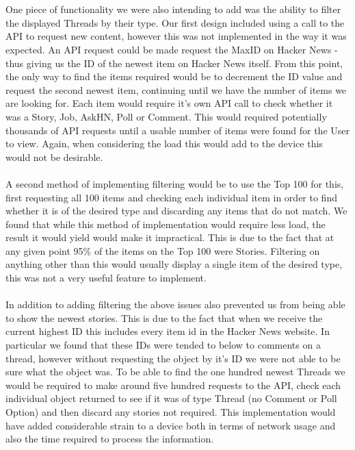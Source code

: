 \documentclass[11pt]{article}
\begin{document}
\\
\\
One piece of functionality we were also intending to add was the ability to filter the displayed Threads by their type. Our first design included using a call to the API to request new content, however this was not implemented in the way it was expected. An API request could be made request the MaxID on Hacker News - thus giving us the ID of the newest item on Hacker News itself. From this point, the only way to find the items required would be to decrement the ID value and request the second newest item, continuing until we have the number of items we are looking for. Each item would require it’s own API call to check whether it was a Story, Job, AskHN, Poll or Comment. This would required potentially thousands of API requests until a usable number of items were found for the User to view. Again, when considering the load this would add to the device this would not be desirable.
\\
\\
A second method of implementing filtering would be to use the Top 100 for this, first requesting all 100 items and checking each individual item in order to find whether it is of the desired type and discarding any items that do not match. We found that while this method of implementation would require less load, the result it would yield would make it impractical. This is due to the fact that at any given point 95\% of the items on the Top 100 were Stories. Filtering on anything other than this would usually display a single item of the desired type, this was not a very useful feature to implement.
\\
\\
In addition to adding filtering the above issues also prevented us from being able to show the newest stories. This is due to the fact that when we receive the current highest ID this includes every item id in the Hacker News website. In particular we found that these IDs were tended to below to comments on a thread, however without requesting the object by it’s ID we were not able to be sure what the object was. To be able to find the one hundred newest Threads we would be required to make around five hundred requests to the API, check each individual object returned to see if it was of type Thread (no Comment or Poll Option) and then discard any stories not required. This implementation would have added considerable strain to a device both in terms of network usage and also the time required to process the information.
\end{document}
